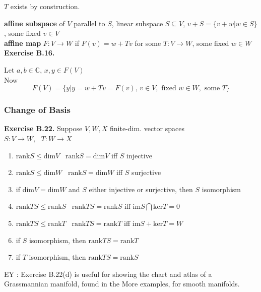 \documentclass[11pt]{amsart}
\theoremstyle{definition}
\newcommand{\exercisehead}[1]{\medskip\noindent\textbf{Exercise #1.} }
\begin{document}
$T$ exists by construction.
\hrulefill


\textbf{ affine subspace } of $V$ parallel to $S$, linear subspace $S \subseteq V$, $v + S = \lbrace v + w | w \in S \rbrace$, some fixed $v \in V$ \\

\textbf{affine map } $F: V \to W$ if $F(v) = w + Tv$ for some $T: V \to W$, some fixed $w\in W$ \\

\exercisehead{B.16}

Let $a,b \in \mathbb{C}$, $x, y \in F(V)$ \\

Now
\[
F(V) = \lbrace y | y = w + Tv = F(v), \, v \in V, \text{ fixed } w \in W , \text{ some } T \rbrace
\]

\subsubsection{Change of Basis}




\exercisehead{B.22} Suppose $V,W, X$ finite-dim. vector spaces \\
$S:V\to W$, \, $T:W \to X$

\begin{enumerate}
\item[(a)] $\text{rank}S \leq \text{dim}V$ \quad \, $\text{rank}S = \text{dim}V$ iff $S$ injective
\item[(b)] $\text{rank}S \leq \text{dim}W$ \quad \, $\text{rank}S = \text{dim}W$ iff $S$ surjective
\item[(c)] if $\text{dim}V = \text{dim}W$ and $S$ either injective or surjective, then $S$ isomorphism
\item[(d)] $\text{rank}TS \leq \text{rank}S$ \quad \, $\text{rank}TS = \text{rank}S$ iff $\text{im}S \bigcap \text{ker}T = 0$
\item[(e)] $\text{rank}TS \leq \text{rank}T$ \quad \, $\text{rank}TS = \text{rank}T$ iff $\text{im}S + \text{ker}T = W$
\item[(f)] if $S$ isomorphism, then $\text{rank}TS = \text{rank}T$
\item[(g)] if $T$ isomorphism, then $\text{rank}TS = \text{rank}S$
\end{enumerate}

EY : Exercise B.22(d) is useful for showing the chart and atlas of a Grassmannian manifold, found in the More examples, for smooth manifolds.
\end{document}
